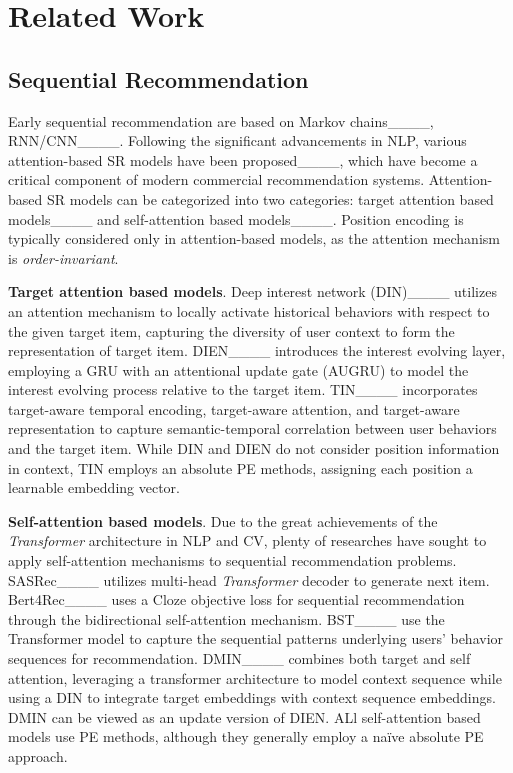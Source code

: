 \section{Related Work}
\subsection{Sequential Recommendation} 
Early sequential recommendation are based on Markov chains____, RNN/CNN____. Following the significant advancements in NLP, various attention-based SR models have been proposed____, which have become a critical component of modern commercial recommendation systems. Attention-based SR models can be categorized into two categories: target attention based models____ and self-attention based models____. Position encoding is typically considered only in attention-based models, as the attention mechanism is \textit{order-invariant}.

\textbf{Target attention based models}. Deep interest network (DIN)____ utilizes an attention mechanism to locally activate historical behaviors with respect to the given target item, capturing the diversity of user context to form the representation of target item. DIEN____ introduces the interest evolving layer, employing a GRU with an attentional update gate (AUGRU) to model the interest evolving process relative to the target item. TIN____ incorporates  target-aware temporal encoding, target-aware attention, and target-aware representation to capture semantic-temporal correlation between user behaviors and the target item. While DIN and DIEN do not consider position information in context, TIN employs an absolute PE methods, assigning each position a learnable embedding vector.

\textbf{Self-attention based models}. Due to the great achievements of the \textit{Transformer} architecture in NLP and CV, plenty of researches have sought to apply self-attention mechanisms to sequential recommendation problems. SASRec____ utilizes multi-head \textit{Transformer} decoder to generate next item. Bert4Rec____ uses a Cloze objective loss for sequential recommendation through the bidirectional self-attention mechanism. BST____ use the Transformer model to capture the sequential patterns underlying users’ behavior sequences for recommendation. DMIN____ combines both target and self attention, leveraging a transformer architecture to model context sequence while using a DIN to integrate target embeddings with context sequence embeddings. DMIN can be viewed as an update version of DIEN. ALl self-attention based models use PE methods, although they generally employ a na\"ive absolute PE approach. 

